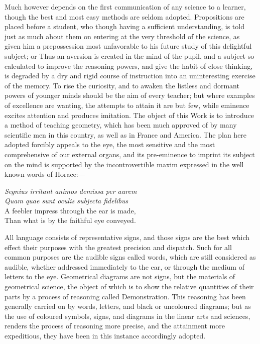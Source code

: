 Much however depends on the first communication of any science to a learner, though the best and most easy methods are seldom adopted. Propositions are placed before a student, who though having a sufficient understanding, is told just as much about them on entering at the very threshold of the science, as given him a prepossession most unfavorable to his future study of this delightful subject; or  %
Thus an aversion is created in the mind of the pupil, and a subject so calculated to improve the reasoning powers, and give the habit of close thinking, is degraded by a dry and rigid course of instruction into an uninteresting exercise of the memory. To rise the curiosity, and to awaken the listless and dormant powers of younger minds should be the aim of every teacher; but where examples of excellence are wanting, the attempts to attain it are but few, while eminence excites attention and produces imitation. The object of this Work is to introduce a method of teaching geometry, which has been much approved of by many scientific men in this country, as well as in France and America. The plan here adopted forcibly appeals to the eye, the most sensitive and the most comprehensive of our external organs, and its pre-eminence to imprint its subject on the mind is supported by the incontrovertible maxim expressed in the well known words of Horace:—

\begin{center}
\emph{Segnius irritant animos demissa per aurem\\
Quam quae sunt oculis subjecta fidelibus}\\
\baselineskip
A feebler impress through the ear is made,\\
Than what is by the faithful eye conveyed.
\end{center}

All language consists of representative signs, and those signs are the best which effect their purposes with the greatest precision and dispatch. Such for all common purposes are the audible signs called words, which are still considered as audible, whether addressed immediately to the ear, or through the medium of letters to the eye. Geometrical diagrams are not signs, but the materials of geometrical science, the object of which is to show the relative quantities of their parts by a process of reasoning called Demonstration. This reasoning has been generally carried on by words, letters, and black or uncoloured diagrams; but as the use of coloured symbols, signs, and diagrams in the linear arts and sciences, renders the process of reasoning more precise, and the attainment more expeditious, they have been in this instance accordingly adopted.

